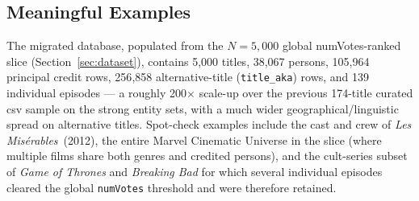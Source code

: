 \subsection{Meaningful Examples}

The migrated database, populated from the $N=5{,}000$ global numVotes-ranked slice (Section~\ref{sec:dataset}), contains 5{,}000 titles, 38{,}067 persons, 105{,}964 principal credit rows, 256{,}858 alternative-title (\texttt{title\_aka}) rows, and 139 individual episodes --- a roughly 200$\times$ scale-up over the previous 174-title curated \ac{csv} sample on the strong entity sets, with a much wider geographical/linguistic spread on alternative titles. Spot-check examples include the cast and crew of \emph{Les Mis\'{e}rables}~(2012), the entire Marvel Cinematic Universe in the slice (where multiple films share both genres and credited persons), and the cult-series subset of \emph{Game of Thrones} and \emph{Breaking Bad} for which several individual episodes cleared the global \texttt{numVotes} threshold and were therefore retained.
